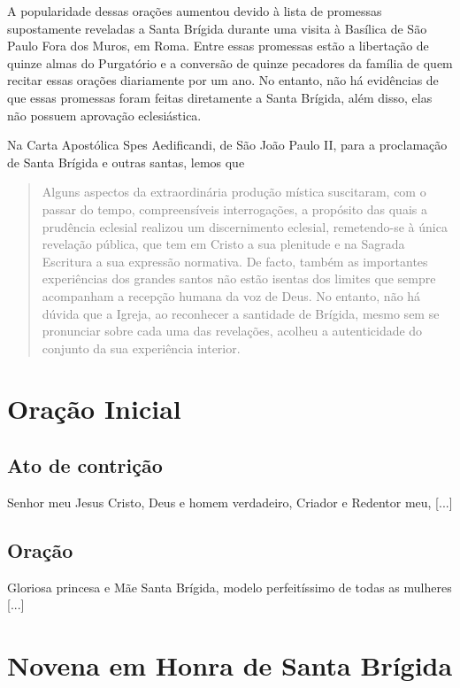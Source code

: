 \documentclass[a4paper,12pt]{extarticle} \usepackage[utf8]{inputenc}
\begin{document}
A popularidade dessas orações aumentou devido à lista de promessas supostamente reveladas a Santa Brígida durante uma visita à Basílica de São Paulo Fora dos Muros, em Roma. Entre essas promessas estão a libertação de quinze almas do Purgatório e a conversão de quinze pecadores da família de quem recitar essas orações diariamente por um ano. No entanto, não há evidências de que essas promessas foram feitas diretamente a Santa Brígida, além disso, elas não possuem aprovação eclesiástica.

  Na Carta Apostólica Spes Aedificandi, de São João Paulo II, para a proclamação de Santa Brígida e outras santas, lemos que

  \begin{quote}
    \textcolor{gray}{Alguns aspectos da extraordinária produção mística suscitaram, com o passar do tempo, compreensíveis interrogações, a propósito das quais a prudência eclesial realizou um discernimento eclesial, remetendo-se à única revelação pública, que tem em Cristo a sua plenitude e na Sagrada Escritura a sua expressão normativa. De facto, também as importantes experiências dos grandes santos não estão isentas dos limites que sempre acompanham a recepção humana da voz de Deus. No entanto, não há dúvida que a Igreja, ao reconhecer a santidade de Brígida, mesmo sem se pronunciar sobre cada uma das revelações, acolheu a autenticidade do conjunto da sua experiência interior.}
  \end{quote}


\section{Oração Inicial} \label{oracao-inicial}

\subsection{Ato de contrição}

Senhor meu Jesus Cristo, Deus e homem verdadeiro, Criador e Redentor meu, [...] 

\subsection{Oração}

Gloriosa princesa e Mãe Santa Brígida, modelo perfeitíssimo de todas as mulheres [...] 

\newpage

\section{Novena em Honra de Santa Brígida}
\end{document}
